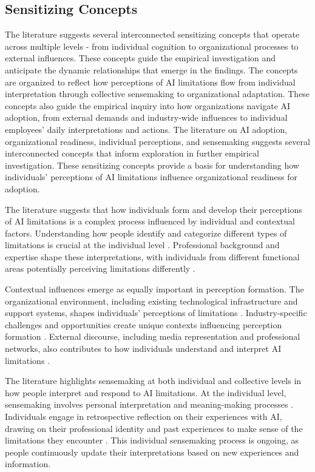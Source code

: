 \subsection{Sensitizing Concepts}

The literature suggests several interconnected sensitizing concepts that operate across multiple levels - from individual cognition to organizational processes to external influences. These concepts guide the empirical investigation and anticipate the dynamic relationships that emerge in the findings. The concepts are organized to reflect how perceptions of AI limitations flow from individual interpretation through collective sensemaking to organizational adaptation. These concepts also guide the empirical inquiry into how organizations navigate AI adoption, from external demands and industry-wide influences to individual employees' daily interpretations and actions. The literature on AI adoption, organizational readiness, individual perceptions, and sensemaking suggests several interconnected concepts that inform exploration in further empirical investigation. These sensitizing concepts provide a basis for understanding how individuals' perceptions of AI limitations influence organizational readiness for adoption.

The literature suggests that how individuals form and develop their perceptions of AI limitations is a complex process influenced by individual and contextual factors. Understanding how people identify and categorize different types of limitations is crucial at the individual level \citep{Muller2022,zhang2023human}. Professional background and expertise shape these interpretations, with individuals from different functional areas potentially perceiving limitations differently \citep{Henry2022}.

Contextual influences emerge as equally important in perception formation. The organizational environment, including existing technological infrastructure and support systems, shapes individuals' perceptions of limitations \citep{Weber2023}. Industry-specific challenges and opportunities create unique contexts influencing perception formation \citep{Yang2024}. External discourse, including media representation and professional networks, also contributes to how individuals understand and interpret AI limitations \citep{Trenerry2021}.

The literature highlights sensemaking at both individual and collective levels in how people interpret and respond to AI limitations. At the individual level, sensemaking involves personal interpretation and meaning-making processes \cite{Weick1995}. Individuals engage in retrospective reflection on their experiences with AI, drawing on their professional identity and past experiences to make sense of the limitations they encounter \citep{Maitlis2014}. This individual sensemaking process is ongoing, as people continuously update their interpretations based on new experiences and information.

